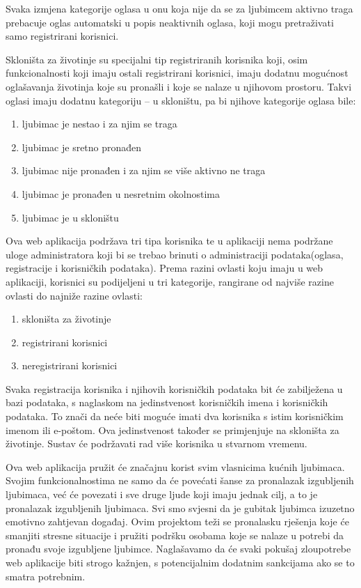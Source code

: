 Svaka izmjena kategorije oglasa u onu koja nije da se za ljubimcem aktivno traga prebacuje oglas automatski u popis neaktivnih oglasa, koji mogu pretraživati samo registrirani korisnici.

Skloništa za životinje su specijalni tip registriranih korisnika koji, osim funkcionalnosti koji imaju ostali registrirani korisnici, imaju dodatnu mogućnost oglašavanja životinja koje su pronašli i koje se nalaze u njihovom prostoru. Takvi oglasi imaju dodatnu kategoriju – u skloništu, pa bi njihove kategorije oglasa bile:

\begin{enumerate}
	\item ljubimac je nestao i za njim se traga
	\item ljubimac je sretno pronađen
	\item ljubimac nije pronađen i za njim se više aktivno ne traga
	\item ljubimac je pronađen u nesretnim okolnostima
	\item ljubimac je u skloništu
\end{enumerate}

Ova web aplikacija podržava tri tipa korisnika te u aplikaciji nema podržane uloge administratora koji bi se trebao brinuti o administraciji podataka(oglasa, registracije i korisničkih podataka). Prema razini ovlasti koju imaju u web aplikaciji, korisnici su podijeljeni u tri kategorije, rangirane od najviše razine ovlasti do najniže razine ovlasti:

\begin{enumerate}
	\item skloništa za životinje
	\item registrirani korisnici
	\item neregistrirani korisnici
\end{enumerate}

Svaka registracija korisnika i njihovih korisničkih podataka bit će zabilježena u bazi podataka, s naglaskom na jedinstvenost korisničkih imena i korisničkih podataka. To znači da neće biti moguće imati dva korisnika s istim korisničkim imenom ili e-poštom. Ova jedinstvenost također se primjenjuje na skloništa za životinje. Sustav će podržavati rad više korisnika u stvarnom vremenu.

Ova web aplikacija pružit će značajnu korist svim vlasnicima kućnih ljubimaca. Svojim funkcionalnostima ne samo da će povećati šanse za pronalazak izgubljenih ljubimaca, već će povezati i sve druge ljude koji imaju jednak cilj, a to je pronalazak izgubljenih ljubimaca. Svi smo svjesni da je gubitak ljubimca izuzetno emotivno zahtjevan događaj. Ovim projektom teži se pronalasku rješenja koje će smanjiti stresne situacije i pružiti podršku osobama koje se nalaze u potrebi da pronađu svoje izgubljene ljubimce. Naglašavamo da će svaki pokušaj zloupotrebe web aplikacije biti strogo kažnjen, s potencijalnim dodatnim sankcijama ako se to smatra potrebnim.

